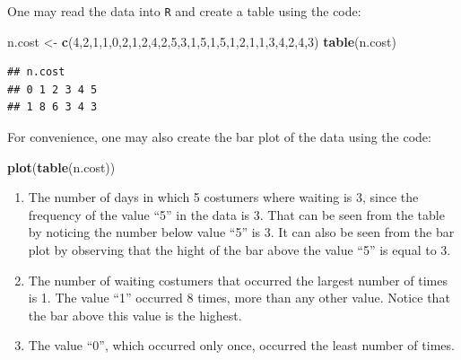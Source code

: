 \documentclass[]{krantz}
\makeatletter
\newenvironment{Shaded}{\begin{snugshade}}{\end{snugshade}}
\newcommand{\KeywordTok}[1]{\textcolor[rgb]{0.13,0.29,0.53}{\textbf{#1}}}
\newcommand{\DecValTok}[1]{\textcolor[rgb]{0.00,0.00,0.81}{#1}}
\newcommand{\StringTok}[1]{\textcolor[rgb]{0.31,0.60,0.02}{#1}}
\newcommand{\NormalTok}[1]{#1}
\newenvironment{kframe}{%
\medskip{}
\setlength{\fboxsep}{.8em}
 \def\at@end@of@kframe{}%
 \ifinner\ifhmode%
  \def\at@end@of@kframe{\end{minipage}}%
  \begin{minipage}{\columnwidth}%
 \fi\fi%
 \def\FrameCommand##1{\hskip\@totalleftmargin \hskip-\fboxsep
 \colorbox{shadecolor}{##1}\hskip-\fboxsep
     \hskip-\linewidth \hskip-\@totalleftmargin \hskip\columnwidth}%
 \MakeFramed {\advance\hsize-\width
   \@totalleftmargin\z@ \linewidth\hsize
   \@setminipage}}%
 {\par\unskip\endMakeFramed%
 \at@end@of@kframe}
\renewenvironment{Shaded}{\begin{kframe}}{\end{kframe}}
\theoremstyle{definition}
\theoremstyle{definition}
\theoremstyle{definition}
\theoremstyle{remark}
\makeatother
\begin{document}
One may read the data into \texttt{R} and create a table using the code:

\begin{Shaded}
\begin{Highlighting}[]
\NormalTok{    n.cost <-}\StringTok{ }\KeywordTok{c}\NormalTok{(}\DecValTok{4}\NormalTok{,}\DecValTok{2}\NormalTok{,}\DecValTok{1}\NormalTok{,}\DecValTok{1}\NormalTok{,}\DecValTok{0}\NormalTok{,}\DecValTok{2}\NormalTok{,}\DecValTok{1}\NormalTok{,}\DecValTok{2}\NormalTok{,}\DecValTok{4}\NormalTok{,}\DecValTok{2}\NormalTok{,}\DecValTok{5}\NormalTok{,}\DecValTok{3}\NormalTok{,}\DecValTok{1}\NormalTok{,}\DecValTok{5}\NormalTok{,}\DecValTok{1}\NormalTok{,}\DecValTok{5}\NormalTok{,}\DecValTok{1}\NormalTok{,}\DecValTok{2}\NormalTok{,}\DecValTok{1}\NormalTok{,}\DecValTok{1}\NormalTok{,}\DecValTok{3}\NormalTok{,}\DecValTok{4}\NormalTok{,}\DecValTok{2}\NormalTok{,}\DecValTok{4}\NormalTok{,}\DecValTok{3}\NormalTok{)}
    \KeywordTok{table}\NormalTok{(n.cost)}
\end{Highlighting}
\end{Shaded}

\begin{verbatim}
## n.cost
## 0 1 2 3 4 5 
## 1 8 6 3 4 3
\end{verbatim}

For convenience, one may also create the bar plot of the data using the
code:

\begin{Shaded}
\begin{Highlighting}[]
\KeywordTok{plot}\NormalTok{(}\KeywordTok{table}\NormalTok{(n.cost))}
\end{Highlighting}
\end{Shaded}

\begin{enumerate}
\def\labelenumi{\arabic{enumi}.}
\item
  The number of days in which 5 costumers where waiting is 3, since the
  frequency of the value ``5'' in the data is 3. That can be seen from
  the table by noticing the number below value ``5'' is 3. It can also
  be seen from the bar plot by observing that the hight of the bar above
  the value ``5'' is equal to 3.
\item
  The number of waiting costumers that occurred the largest number of
  times is 1. The value ``1'' occurred 8 times, more than any other
  value. Notice that the bar above this value is the highest.
\item
  The value ``0'', which occurred only once, occurred the least number
  of times.
\end{enumerate}
\end{document}
